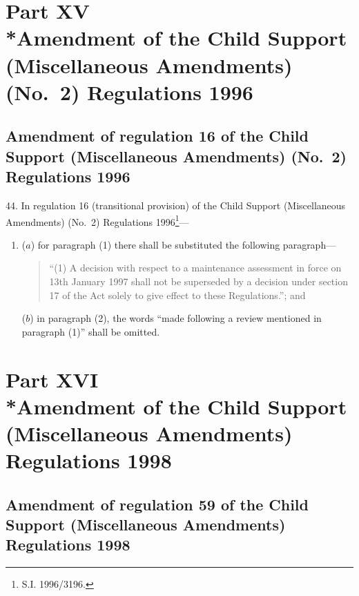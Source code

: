 \documentclass[12pt,a4paper]{article}
\begin{document}
\section[Part XV --- Amendment of the Child Support (Miscellaneous Amendments) (No.\ 2) Regulations 1996]{Part XV\\*Amendment of the Child Support (Miscellaneous Amendments) (No.\ 2) Regulations 1996}

\renewcommand\parthead{--- Part XV}

\subsection[44. Amendment of regulation 16 of the Child Support (Miscellaneous Amendments) (No.\ 2) Regulations 1996]{Amendment of regulation 16 of the Child Support (Miscellaneous Amendments) (No.\ 2) Regulations 1996}

44.  In regulation 16 (transitional provision) of the Child Support (Miscellaneous Amendments) (No.\ 2) Regulations 1996\footnote{\frenchspacing S.I. 1996/3196.}—
\begin{enumerate}\item[]
($a$) for paragraph (1) there shall be substituted the following paragraph—
\begin{quotation}
“(1) A decision with respect to a maintenance assessment in force on 13th January 1997 shall not be superseded by a decision under section 17 of the Act solely to give effect to these Regulations.”; and
\end{quotation}

($b$) in paragraph (2), the words “made following a review mentioned in paragraph (1)” shall be omitted.
\end{enumerate}

\section[Part XVI --- Amendment of the Child Support (Miscellaneous Amendments) Regulations 1998]{Part XVI\\*Amendment of the Child Support (Miscellaneous Amendments) Regulations 1998}

\renewcommand\parthead{--- Part XVI}

\subsection[45. Amendment of regulation 59 of the Child Support (Miscellaneous Amendments) Regulations 1998]{Amendment of regulation 59 of the Child Support (Miscellaneous Amendments) Regulations 1998}
\end{document}
